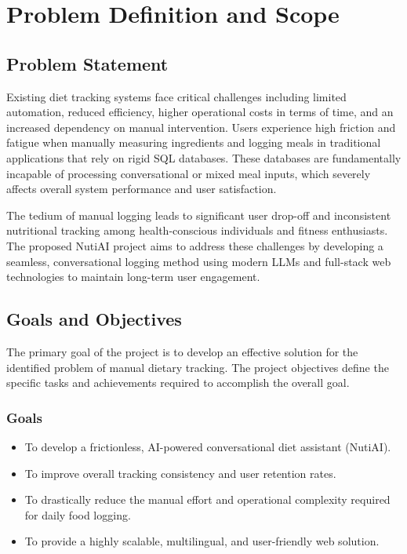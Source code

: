 \documentclass[12pt,a4paper]{report}
\begin{document}
\chapter{Problem Definition and Scope}

\section{Problem Statement}
Existing diet tracking systems face critical challenges including limited automation, reduced efficiency, higher operational costs in terms of time, and an increased dependency on manual intervention. Users experience high friction and fatigue when manually measuring ingredients and logging meals in traditional applications that rely on rigid SQL databases. These databases are fundamentally incapable of processing conversational or mixed meal inputs, which severely affects overall system performance and user satisfaction. 

The tedium of manual logging leads to significant user drop-off and inconsistent nutritional tracking among health-conscious individuals and fitness enthusiasts. The proposed NutiAI project aims to address these challenges by developing a seamless, conversational logging method using modern LLMs and full-stack web technologies to maintain long-term user engagement.

\section{Goals and Objectives}
The primary goal of the project is to develop an effective solution for the identified problem of manual dietary tracking. The project objectives define the specific tasks and achievements required to accomplish the overall goal.

\subsection{Goals}
\begin{itemize}[leftmargin=*]
    \item To develop a frictionless, AI-powered conversational diet assistant (NutiAI).
    \item To improve overall tracking consistency and user retention rates.
    \item To drastically reduce the manual effort and operational complexity required for daily food logging.
    \item To provide a highly scalable, multilingual, and user-friendly web solution.
\end{itemize}
\end{document}
